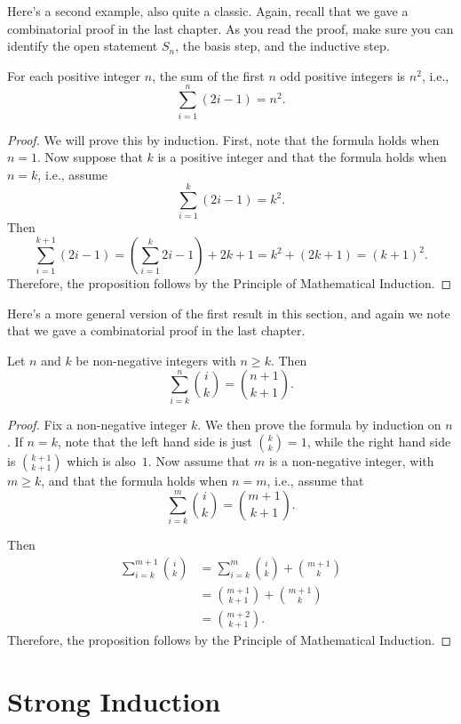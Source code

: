 Here's a second example, also quite a classic.  Again, recall that we
gave a combinatorial proof in the last chapter. As you read the proof,
make sure you can identify the open statement $S_n$, the basis step,
and the inductive step.

\begin{proposition}\label{prop:sumodd}
For each positive integer $n$, the
sum of the first $n$ odd positive integers is $n^2$, i.e.,
\[
\sum_{i=1}^n (2i-1)= n^2.
\]
\end{proposition}
\begin{proof}
We will prove this by induction. First, note that the formula holds when
$n=1$.  Now suppose that $k$ is a positive integer and
that the formula holds when $n=k$, i.e., assume
\[
\sum_{i=1}^k (2i-1)= k^2.
\]
Then
\[
\sum_{i=1}^{k+1}(2i-1)=\left(\sum_{i=1}^k 2i-1\right)+2k+1=
k^2+(2k+1)=(k+1)^2.
\]
Therefore, the proposition follows by the Principle of Mathematical Induction.
\end{proof}

Here's a more general version of the first result in
this section, and again we note that we gave a combinatorial
proof in the last chapter.

\begin{proposition}\label{prop:sum-bincoeffs}
Let $n$ and $k$ be non-negative integers with $n\ge k$.
Then
\[
\sum_{i=k}^n \binom{i}{k}=\binom{n+1}{k+1}.
\]
\end{proposition}
\begin{proof}
Fix a non-negative integer $k$.  We then prove the
formula by induction on $n$.  If $n=k$, note that
the left hand side is just $\binom{k}{k}=1$, while the
right hand side is $\binom{k+1}{k+1}$ which is also~$1$.
Now assume that $m$ is a non-negative integer, with 
$m\ge k$, and that the
formula holds when $n=m$, i.e., assume that
\[
\sum_{i=k}^m \binom{i}{k}=\binom{m+1}{k+1}.
\]

Then
\begin{align*}
\sum_{i=k}^{m+1}\binom{i}{k} &= \sum_{i=k}^{m}\binom{i}{k} +\binom{m+1}{k}\\
        &=\binom{m+1}{k+1}+\binom{m+1}{k}\\
        &=\binom{m+2}{k+1}.
\end{align*} 
Therefore, the proposition follows by the Principle of Mathematical Induction.
\end{proof}


\section{Strong Induction}\label{s:induction:strong-induction}


